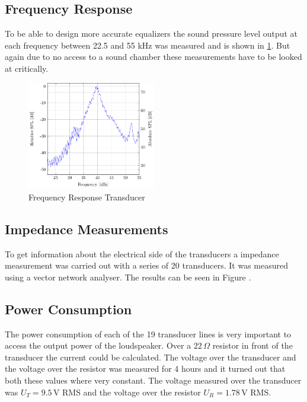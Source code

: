 \subsection{Frequency Response}\label{6_sec:Frequency_response}
To be able to design more accurate equalizers the sound pressure level output at each frequency between 22.5 and 55 kHz was measured and is shown in \ref{6_Measurement_fig:Transducer_FR}. But again due to no access to a sound chamber these measurements have to be looked at critically.
\begin{figure}[h!]
    \centering
    \includegraphics[width=0.5\textwidth]{images/6_Measurements/Transducer_Frequency_Respone.pdf}
    \caption{Frequency Response Transducer}
    \label{6_Measurement_fig:Transducer_FR}
\end{figure}
\subsection{Impedance Measurements}
To get information about the electrical side of the transducers a impedance measurement was carried out with a series of 20 transducers. It was measured using a vector network analyser. The results can be seen in Figure .
\subsection{Power Consumption}\label{6_subsec:Power_cons}
The power consumption of each of the 19 transducer lines is very important to access the output power of the loudspeaker. Over a $22 \, \Omega$ resistor in front of the transducer the current could be calculated. The voltage over the transducer and the voltage over the resistor was measured for 4 hours and it turned out that both these values where very constant. The voltage measured over the transducer was $U_T = 9.5 \,$V RMS and the voltage over the resistor $U_R = 1.78 \,$V RMS.
\newpage
